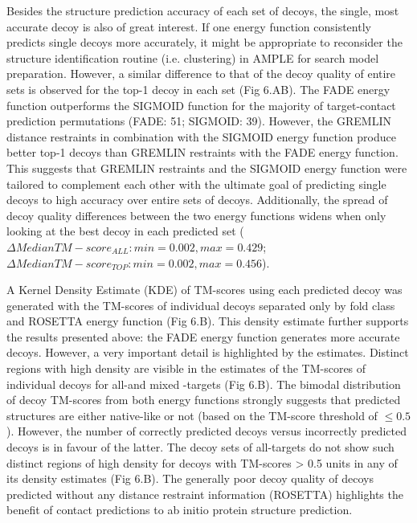 Besides the structure prediction accuracy of each set of decoys, the single, most accurate decoy is also of great interest. If one energy function consistently predicts single decoys more accurately, it might be appropriate to reconsider the structure identification routine (i.e. clustering) in AMPLE for search model preparation. However, a similar difference to that of the decoy quality of entire sets is observed for the top-1 decoy in each set (Fig 6.AB). The FADE energy function outperforms the SIGMOID function for the majority of target-contact prediction permutations (FADE: 51; SIGMOID: 39). However, the GREMLIN distance restraints in combination with the SIGMOID energy function produce better top-1 decoys than GREMLIN restraints with the FADE energy function. This suggests that GREMLIN restraints and the SIGMOID energy function were tailored to complement each other with the ultimate goal of predicting single decoys to high accuracy over entire sets of decoys. Additionally, the spread of decoy quality differences between the two energy functions widens when only looking at the best decoy in each predicted set ($\Delta Median TM-score_{ALL}: min=0.002, max=0.429$; $\Delta Median TM-score_{TOP}: min=0.002, max=0.456$). 

A Kernel Density Estimate (KDE) of TM-scores using each predicted decoy was generated with the TM-scores of individual decoys separated only by fold class and ROSETTA energy function (Fig 6.B). This density estimate further supports the results presented above: the FADE energy function generates more accurate decoys. However, a very important detail is highlighted by the estimates. Distinct regions with high density are visible in the estimates of the TM-scores of individual decoys for all-\textalpha and mixed \textalpha-\textbeta targets (Fig 6.B). The bimodal distribution of decoy TM-scores from both energy functions strongly suggests that predicted structures are either native-like or not (based on the TM-score threshold of $\leq0.5$). However, the number of correctly predicted decoys versus incorrectly predicted decoys is in favour of the latter. The decoy sets of all-\textbeta targets do not show such distinct regions of high density for decoys with TM-scores > 0.5 units in any of its density estimates (Fig 6.B). The generally poor decoy quality of decoys predicted without any distance restraint information (ROSETTA) highlights the benefit of contact predictions to ab initio protein structure prediction.

